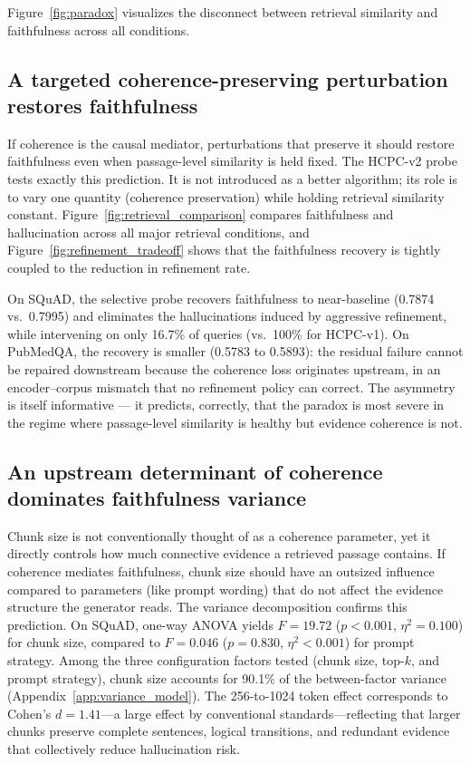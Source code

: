 
Figure~\ref{fig:paradox} visualizes the disconnect between retrieval
similarity and faithfulness across all conditions.



\subsection{A targeted coherence-preserving perturbation restores faithfulness}


If coherence is the causal mediator, perturbations that preserve it should
restore faithfulness even when passage-level similarity is held fixed. The
HCPC-v2 probe tests exactly this prediction. It is not introduced as a
better algorithm; its role is to vary one quantity (coherence preservation)
while holding retrieval similarity constant.
Figure~\ref{fig:retrieval_comparison} compares faithfulness and hallucination
across all major retrieval conditions, and
Figure~\ref{fig:refinement_tradeoff} shows that the faithfulness recovery is
tightly coupled to the reduction in refinement rate.

On SQuAD, the selective probe recovers faithfulness to near-baseline
(0.7874 vs.\ 0.7995) and eliminates the hallucinations induced by
aggressive refinement, while intervening on only 16.7\% of queries (vs.\
100\% for HCPC-v1). On PubMedQA, the recovery is smaller (0.5783 to
0.5893): the residual failure cannot be repaired downstream because the
coherence loss originates upstream, in an encoder--corpus mismatch that
no refinement policy can correct. The asymmetry is itself informative
— it predicts, correctly, that the paradox is most severe in the regime
where passage-level similarity is healthy but evidence coherence is not.

\subsection{An upstream determinant of coherence dominates faithfulness variance}

Chunk size is not conventionally thought of as a coherence parameter, yet
it directly controls how much connective evidence a retrieved passage
contains. If coherence mediates faithfulness, chunk size should have an
outsized influence compared to parameters (like prompt wording) that do
not affect the evidence structure the generator reads. The variance
decomposition confirms this prediction. On SQuAD, one-way ANOVA yields $F = 19.72$
($p < 0.001$, $\eta^2 = 0.100$) for chunk size, compared to $F = 0.046$
($p = 0.830$, $\eta^2 < 0.001$) for prompt strategy. Among the three
configuration factors tested (chunk size, top-$k$, and prompt strategy),
chunk size accounts for 90.1\% of the between-factor variance
(Appendix~\ref{app:variance_model}). The 256-to-1024 token effect
corresponds to Cohen's $d = 1.41$---a large effect by conventional
standards---reflecting that larger chunks preserve complete sentences,
logical transitions, and redundant evidence that collectively reduce
hallucination risk.


